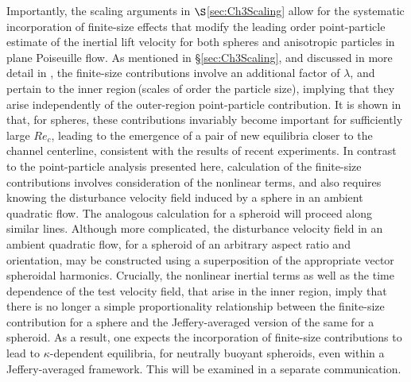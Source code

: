 \documentclass{jfm}
\begin{document}
Importantly, the scaling arguments in $\S$\ref{sec:Ch3Scaling} allow for the systematic incorporation of finite-size effects that modify the leading order point-particle estimate of the inertial lift velocity for both spheres and anisotropic particles in plane Poiseuille flow. As mentioned in \S\ref{sec:Ch3Scaling}, and discussed in more detail in \cite{anandfinitesize2022}, the finite-size contributions involve an additional factor of $\lambda$, and pertain to the inner region\,(scales of order the particle size), implying that they arise independently of the outer-region point-particle contribution. It is shown in \cite{anandfinitesize2022} that, for spheres, these contributions invariably become important for sufficiently large $Re_c$, leading to the emergence of a pair of new equilibria closer to the channel centerline, consistent with the results of recent experiments. In contrast to the point-particle analysis presented here, calculation of the finite-size contributions involves consideration of the nonlinear terms, and also requires knowing the disturbance velocity field induced by a sphere in an ambient quadratic flow. The analogous calculation for a spheroid will proceed along similar lines. Although more complicated, the disturbance velocity field in an ambient quadratic flow, for a spheroid of an arbitrary aspect ratio and orientation, may be constructed using a superposition of the appropriate vector spheroidal harmonics\citep{navaneeth2015,navaneeth2016}. Crucially, the nonlinear inertial terms as well as the time dependence of the test velocity field, that arise in the inner region, imply that there is no longer a simple proportionality relationship between the finite-size contribution for a sphere and the Jeffery-averaged version of the same for a spheroid. As a result, one expects the incorporation of finite-size contributions to lead to $\kappa$-dependent equilibria, for neutrally buoyant spheroids, even within a Jeffery-averaged framework. This will be examined in a separate communication.
   
\appendix
\end{document}
